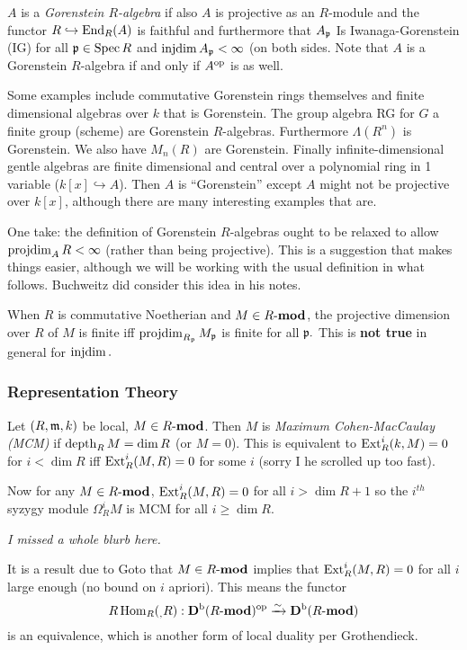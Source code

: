 \documentclass[12pt]{article}
\begin{document}
$A$ is a \emph{Gorenstein $R$-algebra} if also $A$ is projective as an $R$-module and the functor $R\hookrightarrow \operatorname{End}_R(A)$ is faithful and furthermore that $A_{\mathfrak{p}}$ Is Iwanaga-Gorenstein (IG) for all $\mathfrak{p}\in\operatorname{Spec} R$ and $\operatorname{injdim} A_{\mathfrak{p}}<\infty$ (on both sides. Note that $A$ is a Gorenstein $R$-algebra if and only if $A^{\text{op}}$ is as well.

Some examples include commutative Gorenstein rings themselves and finite dimensional algebras over $k$ that is Gorenstein. The group algebra RG for $G$ a finite group (scheme) are Gorenstein $R$-algebras. Furthermore $\Lambda(R^n)$ is Gorenstein. We also have $M_n(R)$ are Gorenstein. Finally infinite-dimensional gentle algebras are finite dimensional and central over a polynomial ring in 1 variable ($k[x]\hookrightarrow A$). Then $A$ is ``Gorenstein'' except $A$ might not be projective over $k[x]$, although there are many interesting examples that are.

One take: the definition of Gorenstein $R$-algebras ought to be relaxed to allow $\operatorname{projdim}_A R<\infty$ (rather than being projective). This is a suggestion that makes things easier, although we will be working with the usual definition in what follows. Buchweitz did consider this idea in his notes.

When $R$ is commutative Noetherian and $M\in R\text{-}\mathbf{mod}$, the projective dimension over $R$ of $M$ is finite iff $\operatorname{projdim}_{R_{\mathfrak{p}}}M_{\mathfrak{p}}$ is finite for all $\mathfrak{p}.$ This is \textbf{not true} in general for $\operatorname{injdim}.$

\subsubsection{Representation Theory}
Let $(R,\mathfrak{m}, k)$ be local, $M\in R\text{-}\mathbf{mod}$. Then $M$ is \emph{Maximum Cohen-MacCaulay (MCM)}
 if $\operatorname{depth}_R M=\dim R$ (or $M=0$). This is equivalent to $\operatorname{Ext}_R^i(k,M)=0$ for $i<\dim R$ iff $\operatorname{Ext}_R^i(M,R)=0$ for some $i$ (sorry I he scrolled up too fast).
 
 Now for any $M\in R\text{-}\mathbf{mod}$, $\operatorname{Ext}_R^i(M,R)=0$ for all $i>\dim R + 1$ so the $i^{th}$ syzygy module $\Omega^i_R M$ is MCM for all $i\ge \dim R$. 
 
 \textit{I missed a whole blurb here.}
  
 It is a result due to Goto that $M\in R\text{-}\mathbf{mod}$ implies that $\operatorname{Ext}_R^i(M,R)=0$ for all $i$ large enough (no bound on $i$ apriori). This means the functor
 \[R\operatorname{Hom}_R(_,R):\mathbf{D}^\text{b}(R\text{-}\mathbf{mod})^{\text{op}}\xrightarrow{\sim}\mathbf{D}^\text{b}(R\text{-}\mathbf{mod})\]
 is an equivalence, which is another form of local duality per Grothendieck.
 
\end{document}
